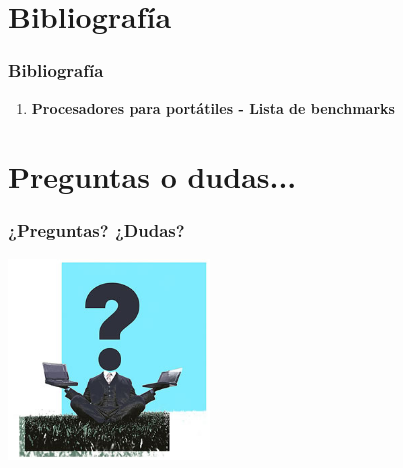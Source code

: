 \section{Bibliografía}
\frame
{
\frametitle{Bibliografía}
\tiny
\begin{enumerate}
 \item \textbf{Procesadores para portátiles - Lista de benchmarks}\newline



\end{enumerate}
}


\section*{Preguntas o dudas...}
\frame
{
\frametitle{¿Preguntas? ¿Dudas?}
\begin{center}
\includegraphics[width=0.4\textwidth]{imgs/preguntas.jpg}
\end{center}
}
